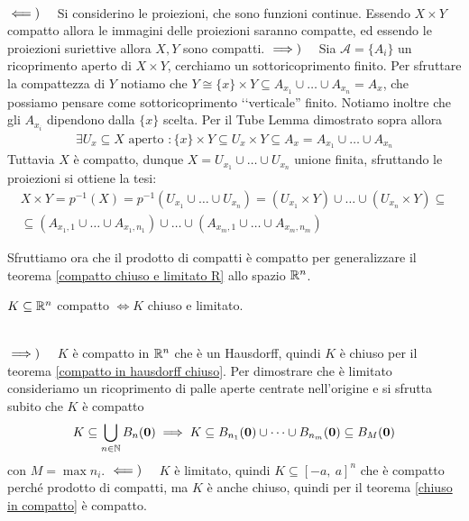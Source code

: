 \begin{demonstration}~{}\\
	$\impliedby)\quad $ Si considerino le proiezioni, che sono funzioni continue. Essendo $X\times Y$ compatto allora le immagini delle proiezioni saranno compatte, ed essendo le proiezioni suriettive allora $X,Y$ sono compatti. \newline
	$\implies)\quad $ Sia $\mathcal{A}=\{A_i\}$ un ricoprimento aperto di $X\times Y$, cerchiamo un sottoricoprimento finito.\newline
	Per sfruttare la compattezza di $Y$ notiamo che $Y\cong \{x\}\times Y\subseteq A_{x_1}\cup\dots\cup A_{x_n}=A_x$, che possiamo pensare come sottoricoprimento ‘‘verticale'' finito. Notiamo inoltre che gli $A_{x_i}$ dipendono dalla $\{x\}$ scelta.\newline
	Per il Tube Lemma dimostrato sopra allora 
		\begin{gather*}
			\exists U_x\subseteq X \text{ aperto }\colon \{ x\}\times Y \subseteq U_x\times Y \subseteq A_x=A_{x_1}\cup\dots\cup A_{x_n}
		\end{gather*}
	Tuttavia $X$ è compatto, dunque $X=U_{x_1}\cup\dots\cup U_{x_n}$ unione finita, sfruttando le proiezioni si ottiene la tesi:
		\begin{gather*}
			X\times Y =p^{-1}(X)=p^{-1}\left( U_{x_1}\cup\dots\cup U_{x_n}\right)= (U_{x_1}\times Y)\cup\dots\cup (U_{x_n}\times Y)\subseteq \\
			\subseteq \left( A_{x_1 , 1}\cup\dots\cup A_{x_1, n_1}\right) \cup\dots\cup \left( A_{x_m, 1}\cup\dots\cup A_{x_m, n_m} \right)
		\end{gather*}
\end{demonstration}
Sfruttiamo ora che il prodotto di compatti è compatto per generalizzare il teorema \ref{compatto chiuso e limitato R} allo spazio $\mathbb{R} ^n$.
\begin{theorema} \label{compatto chiuso e limitato R^n}
	$K\subseteq \mathbb{R}^n$ compatto $\iff K$ chiuso e limitato.
\end{theorema}
\begin{demonstration} ~{} \\
	$\implies)\quad$ $K$ è compatto in $\mathbb{R}^n$ che è un Hausdorff, quindi $K$ è chiuso per il teorema \ref{compatto in hausdorff chiuso}. Per dimostrare che è limitato  consideriamo un ricoprimento di palle aperte centrate nell'origine e si sfrutta subito che $K$ è compatto
		\begin{gather*}
			K\subseteq \mathop{{\bigcup}}\displaylimits_{n\in\mathbb{N}} B_n(\mathbf{0}) \implies K\subseteq B_{n_1}(\mathbf{0})\cup\dots\cup B_{n_m}(\mathbf{0}) \subseteq B_M (\mathbf{0})
		\end{gather*}
	con $M=\max n_i$.\newline
	$\impliedby)\quad$ $K$ è limitato, quindi $K\subseteq [-a,\ a]^n$ che è compatto perché prodotto di compatti, ma $K$ è anche chiuso, quindi per il teorema \ref{chiuso in compatto} è compatto.
\end{demonstration}
